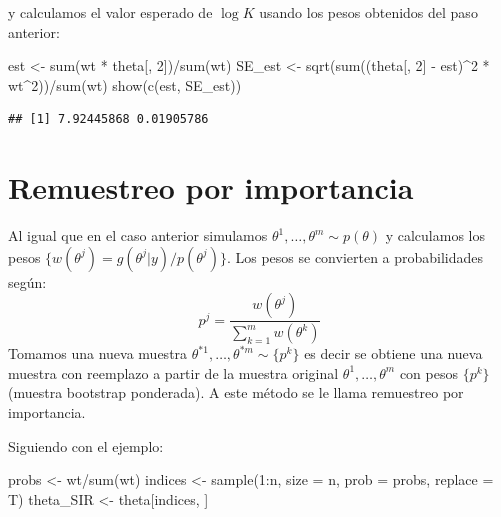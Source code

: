 \documentclass[
  12pt,
]{book}
\newenvironment{Shaded}{\begin{snugshade}}{\end{snugshade}}
\newcommand{\AttributeTok}[1]{\textcolor[rgb]{0.77,0.63,0.00}{#1}}
\newcommand{\DecValTok}[1]{\textcolor[rgb]{0.00,0.00,0.81}{#1}}
\newcommand{\FunctionTok}[1]{\textcolor[rgb]{0.00,0.00,0.00}{#1}}
\newcommand{\NormalTok}[1]{#1}
\newcommand{\OtherTok}[1]{\textcolor[rgb]{0.56,0.35,0.01}{#1}}
\newcommand{\SpecialCharTok}[1]{\textcolor[rgb]{0.00,0.00,0.00}{#1}}
\theoremstyle{definition}
\theoremstyle{definition}
\theoremstyle{definition}
\theoremstyle{definition}
\theoremstyle{remark}
\begin{document}
y calculamos el valor esperado de \(\log K\) usando los pesos obtenidos del paso anterior:

\begin{Shaded}
\begin{Highlighting}[]
\NormalTok{est }\OtherTok{\textless{}{-}} \FunctionTok{sum}\NormalTok{(wt }\SpecialCharTok{*}\NormalTok{ theta[, }\DecValTok{2}\NormalTok{])}\SpecialCharTok{/}\FunctionTok{sum}\NormalTok{(wt)}
\NormalTok{SE\_est }\OtherTok{\textless{}{-}} \FunctionTok{sqrt}\NormalTok{(}\FunctionTok{sum}\NormalTok{((theta[, }\DecValTok{2}\NormalTok{] }\SpecialCharTok{{-}}\NormalTok{ est)}\SpecialCharTok{\^{}}\DecValTok{2} \SpecialCharTok{*}\NormalTok{ wt}\SpecialCharTok{\^{}}\DecValTok{2}\NormalTok{))}\SpecialCharTok{/}\FunctionTok{sum}\NormalTok{(wt)}
\FunctionTok{show}\NormalTok{(}\FunctionTok{c}\NormalTok{(est, SE\_est))}
\end{Highlighting}
\end{Shaded}

\begin{verbatim}
## [1] 7.92445868 0.01905786
\end{verbatim}

\hypertarget{remuestreo-por-importancia}{%
\section{Remuestreo por importancia}\label{remuestreo-por-importancia}}

Al igual que en el caso anterior simulamos \(\theta^1,\ldots,\theta^m\sim p(\theta)\) y calculamos los pesos \(\{w(\theta^j)=g(\theta^j|y)/p(\theta^j)\}\). Los pesos se convierten a probabilidades según:
\[p^j=\frac{w(\theta^j)}{\sum_{k=1}^mw(\theta^k)}\]
Tomamos una nueva muestra \(\theta^{*1},\ldots,\theta^{*m}\sim \{p^k\}\) es decir se obtiene una nueva muestra con reemplazo a partir de la muestra original \(\theta^1,\ldots,\theta^m\) con pesos \(\{p^k\}\) (muestra bootstrap ponderada). A este método se le llama remuestreo por importancia.

Siguiendo con el ejemplo:

\begin{Shaded}
\begin{Highlighting}[]
\NormalTok{probs }\OtherTok{\textless{}{-}}\NormalTok{ wt}\SpecialCharTok{/}\FunctionTok{sum}\NormalTok{(wt)}
\NormalTok{indices }\OtherTok{\textless{}{-}} \FunctionTok{sample}\NormalTok{(}\DecValTok{1}\SpecialCharTok{:}\NormalTok{n, }\AttributeTok{size =}\NormalTok{ n, }\AttributeTok{prob =}\NormalTok{ probs, }\AttributeTok{replace =}\NormalTok{ T)}
\NormalTok{theta\_SIR }\OtherTok{\textless{}{-}}\NormalTok{ theta[indices, ]}
\end{Highlighting}
\end{Shaded}
\end{document}
